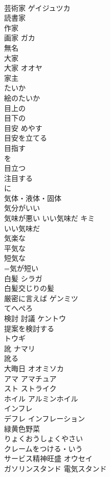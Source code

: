 \documentclass[8pt]{extreport}
\begin{document}
\begin{CJK}{UTF8}{min}
\\	芸術家	ゲイジュツカ 
\\	読書家	
\\	作家	
\\	画家	ガカ 
\\	無名	
\\	大家
\\	大家	オオヤ 
\\	家主 
\\	たいか 
\\	絵のたいか 
\\	目上の
\\	目下の
\\	目安	めやす 
\\	目安を立てる 
\\	目指す	
\\	を
\\	目立つ	
\\	注目する	
\\	に
\\	気体・液体・固体	
\\	気分がいい	
\\	気味が悪い いい気味だ	キミ 
\\	いい気味だ 
\\	気楽な	
\\	平気な	
\\	短気な	
\\	=気が短い
\\	白髪	シラガ 
\\	白髪交じりの髪 
\\	厳密に言えば	ゲンミツ 
\\	てへぺろ	
\\	検討 討議	ケントウ 
\\	提案を検討する 
\\	トウギ 
\\	訛	ナマリ 
\\	訛る
\\	大晦日	オオミソカ 
\\	アマ	アマチュア
\\	スト	ストライク
\\	ホイル	アルミンホイル
\\	インフレ　
\\	デフレ	インフレーション
\\	緑黄色野菜	
\\	りょくおうしょくやさい
\\	クレームをつける・いう	
\\	サービス精神旺盛	オウセイ 
\\	ガソリンスタンド 電気スタンド	

\end{CJK}
\end{document}
